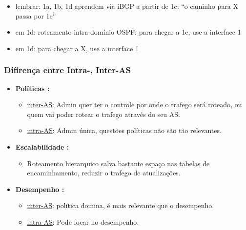 \begin{itemize}[left=0.5cm, align=left, nosep]
                \begin{itemize}[left=0.5cm, nosep, label=$\hookrightarrow$]
                    \item lembrar: 1a, 1b, 1d aprendem via iBGP a partir de 1c: ``o caminho para X passa por 1c''
                    \item em 1d: roteamento intra-domínio OSPF: para chegar a 1c, use a interface 1
                    \item em 1d: para chegar a X, use a interface 1 
                \end{itemize}
                
            \end{itemize}
    
        \subsubsection*{Difirença entre Intra-, Inter-AS}
        \begin{itemize}[left=0.5cm, align=left, nosep]
            \item \textbf{Políticas :}
            \begin{itemize}[left=0.5cm, nosep, label=$\hookrightarrow$]
                \item \underline{inter-AS}: Admin quer ter o controle por onde o trafego será roteado, ou quem vai poder rotear o trafego através do seu AS. 
                \item \underline{intra-AS}: Admin única, questões políticas não são tão relevantes.
            \end{itemize}
            
            \item \textbf{Escalabilidade :}  
            \begin{itemize}[left=0.5cm, nosep, label=$\hookrightarrow$]
                \item Roteamento hierarquico salva bastante espaço nas tabelas de encaminhamento, reduzir o trafego de atualizações.
            \end{itemize}
        
            \item \textbf{Desempenho :}
            \begin{itemize}[left=0.5cm, nosep, label=$\hookrightarrow$]
                \item \underline{inter-AS}: política domina, é mais relevante que o desempenho. 
                \item \underline{intra-AS}: Pode focar no desempenho.
            \end{itemize}

        \end{itemize}
        
